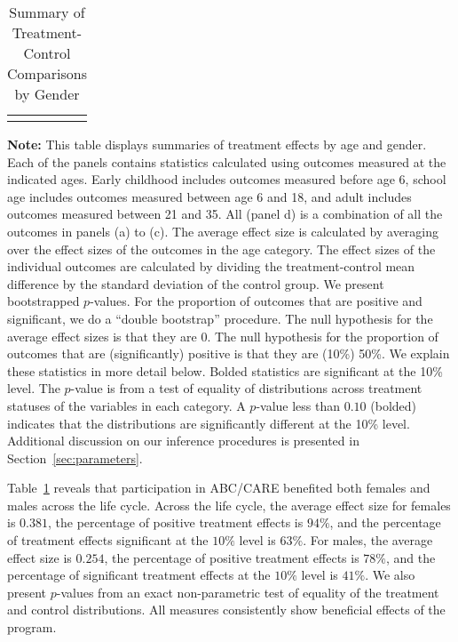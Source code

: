 \begin{table}[!htpb]
\begin{threeparttable}
\caption{Summary of Treatment-Control Comparisons by Gender} \label{table:summary}
\centering
\begin{tabularx}{16.5cm}{XcX}
&  &
\end{tabularx}
\begin{tablenotes}
\footnotesize
\item \textbf{Note:} This table displays summaries of treatment effects by age and gender. Each of the panels contains statistics calculated using outcomes measured at the indicated ages. Early childhood includes outcomes measured before age 6, school age includes outcomes measured between age 6 and 18, and adult includes outcomes measured between 21 and 35. All (panel d) is a combination of all the outcomes in panels (a) to (c). The average effect size is calculated by averaging over the effect sizes of the outcomes in the age category. The effect sizes of the individual outcomes are calculated by dividing the treatment-control mean difference by the standard deviation of the control group. We present bootstrapped $p$-values. For the proportion of outcomes that are positive and significant, we do a ``double bootstrap'' procedure. The null hypothesis for the average effect sizes is that they are 0. The null hypothesis for the proportion of outcomes that are (significantly) positive is that they are (10\%) 50\%. We explain these statistics in more detail below. Bolded statistics are significant at the 10\% level. The \citet{Rosenbaum_2005_Distribution_JRSS} $p$-value is from a test of equality of distributions across treatment statuses of the variables in each category. A $p$-value less than $0.10$ (bolded) indicates that the distributions are significantly different at the 10\% level. Additional discussion on our inference procedures is presented in Section~\ref{sec:parameters}.
\end{tablenotes}
\end{threeparttable}
\end{table}

Table~\ref{table:summary} reveals that participation in ABC/CARE benefited both females and males across the life cycle. Across the life cycle, the average effect size for females is $0.381$, the percentage of positive treatment effects is $94\%$, and the percentage of treatment effects significant at the $10\%$ level is $63\%$. For males, the average effect size is $0.254$, the percentage of positive treatment effects is $78\%$, and the percentage of significant treatment effects at the $10\%$ level is $41\%$. We also present $p$-values from an exact non-parametric test of equality of the treatment and control distributions. All measures consistently show beneficial effects of the program.

